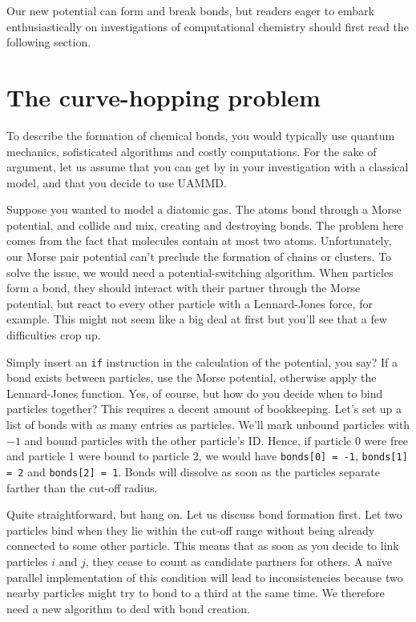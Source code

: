 Our new potential can form and break bonds, but readers eager to embark 
enthusiastically on investigations of computational chemistry should first read 
the following section.

\section{The curve-hopping problem}

To describe the formation of chemical bonds, you would typically use quantum 
mechanics, sofisticated algorithms and costly computations. For the sake of 
argument, let us assume that you can get by in your investigation with a 
classical model, and that you decide to use UAMMD.

Suppose you wanted to model a diatomic gas. The atoms bond through a Morse 
potential, and collide and mix, creating and destroying bonds. The problem here 
comes from the fact that molecules contain at most two atoms. Unfortunately, our 
Morse pair potential can't preclude the formation of chains or clusters. To 
solve the issue, we would need a potential-switching algorithm. When particles 
form a bond, they should interact with their partner through the Morse 
potential, but react to every other particle with a Lennard-Jones force, for 
example. This might not seem like a big deal at first but you'll see that a few 
difficulties crop up.

Simply insert an \texttt{if} instruction in the calculation of the potential,
you say? If a bond exists between particles, use the Morse potential, otherwise 
apply the Lennard-Jones function. Yes, of course, but how do you decide when to 
bind particles together? This requires a decent amount of bookkeeping. Let's set 
up a list of bonds with as many entries as particles. We'll mark unbound 
particles with $-1$ and bound particles with the other particle's ID. Hence, 
if particle 0 were free and particle 1 were bound to particle 2, we would have
\texttt{bonds[0] = -1}, \texttt{bonds[1] = 2} and \texttt{bonds[2] = 1}. Bonds 
will dissolve as soon as the particles separate farther than the cut-off radius.

Quite straightforward, but hang on. Let us discuss bond formation first. Let two 
particles bind when they lie within the cut-off range without being already 
connected to some other particle. This means that as soon as you decide to link 
particles $i$ and $j$, they cease to count as candidate partners for others. A 
na\"ive parallel implementation of this condition will lead to inconsistencies 
because two nearby particles might try to bond to a third at the same time. We 
therefore need a new algorithm to deal with bond creation.

